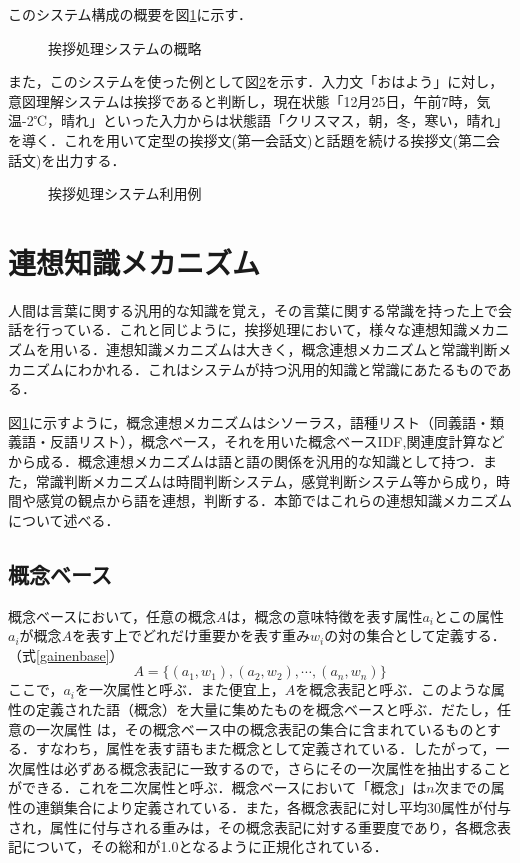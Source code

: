 このシステム構成の概要を図\ref{fig:aisatsuSystem}に示す．
\begin{figure}[htbp]
	\begin{center}
	  	\epsfxsize=8cm
		\caption{挨拶処理システムの概略}
		\label{fig:aisatsuSystem}
	\end{center}
\end{figure}

また，このシステムを使った例として図\ref{fig:aisatsuSystemExam}を示す．入力文「おはよう」に対し，意図理解システムは挨拶であると判断し，現在状態「12月25日，午前7時，気温-2℃，晴れ」といった入力からは状態語「クリスマス，朝，冬，寒い，晴れ」を導く．これを用いて定型の挨拶文(第一会話文)と話題を続ける挨拶文(第二会話文)を出力する．
\begin{figure}[htbp]
	\begin{center}
	  	\epsfxsize=10cm
		\caption{挨拶処理システム利用例}
		\label{fig:aisatsuSystemExam}
	\end{center}
\end{figure}

\section{連想知識メカニズム} \label{riyouchishiki}
人間は言葉に関する汎用的な知識を覚え，その言葉に関する常識を持った上で会話を行っている．これと同じように，挨拶処理において，様々な連想知識メカニズムを用いる．連想知識メカニズムは大きく，概念連想メカニズムと常識判断メカニズムにわかれる．これはシステムが持つ汎用的知識と常識にあたるものである．

図\ref{fig:aisatsuSystem}に示すように，概念連想メカニズムはシソーラス，語種リスト（同義語・類義語・反語リスト），概念ベース，それを用いた概念ベースIDF,関連度計算などから成る．概念連想メカニズムは語と語の関係を汎用的な知識として持つ．また，常識判断メカニズムは時間判断システム，感覚判断システム等から成り，時間や感覚の観点から語を連想，判断する．本節ではこれらの連想知識メカニズムについて述べる．

\subsection{概念ベース}
概念ベースにおいて，任意の概念$A$は，概念の意味特徴を表す属性$a_i$とこの属性$a_i$が概念$A$を表す上でどれだけ重要かを表す重み$w_i$の対の集合として定義する．（式\ref{gainenbase}）
\begin{equation}
A=\{(a_1,w_1),(a_2,w_2),\cdots,(a_n,w_n)\} \label{gainenbase}
\end{equation}
ここで，$a_i$を一次属性と呼ぶ．また便宜上，$A$を概念表記と呼ぶ．このような属性の定義された語（概念）を大量に集めたものを概念ベースと呼ぶ．だたし，任意の一次属性 は，その概念ベース中の概念表記の集合に含まれているものとする．すなわち，属性を表す語もまた概念として定義されている．したがって，一次属性は必ずある概念表記に一致するので，さらにその一次属性を抽出することができる．これを二次属性と呼ぶ．概念ベースにおいて「概念」は$n$次までの属性の連鎖集合により定義されている．また，各概念表記に対し平均30属性が付与され，属性に付与される重みは，その概念表記に対する重要度であり，各概念表記について，その総和が1.0となるように正規化されている．

